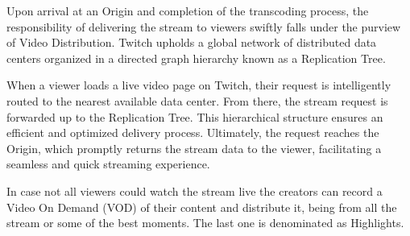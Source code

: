     Upon arrival at an Origin and completion of the transcoding process, the responsibility of delivering the stream to viewers swiftly falls under the purview of Video Distribution. Twitch upholds a global network of distributed data centers organized in a directed graph hierarchy known as a Replication Tree.

    When a viewer loads a live video page on Twitch, their request is intelligently routed to the nearest available data center. From there, the stream request is forwarded up to the Replication Tree. This hierarchical structure ensures an efficient and optimized delivery process. Ultimately, the request reaches the Origin, which promptly returns the stream data to the viewer, facilitating a seamless and quick streaming experience.

    In case not all viewers could watch the stream live the creators can record a Video On Demand (VOD) of their content and distribute it, being from all the stream or some of the best moments. The last one is denominated as Highlights.






